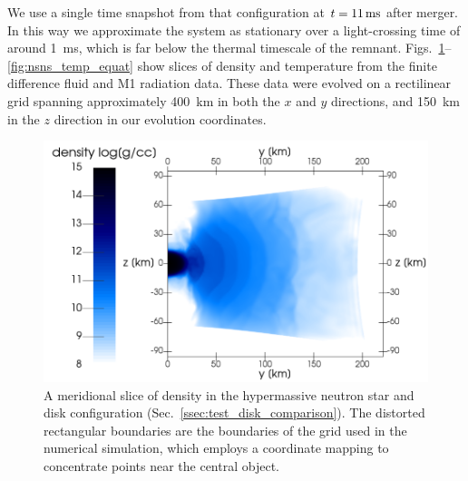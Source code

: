 \documentclass[aps,floatfix,prd,superscriptaddress,twocolumn]{revtex4-1}
\begin{document}
We use a single time snapshot from that configuration
at $t=11\,{\rm ms}$ after merger.
In this way we approximate the system as stationary over a light-crossing time
of around 1~ms, which is far below the thermal timescale of the remnant.
Figs.~\ref{fig:nsns_rho_merid}--\ref{fig:nsns_temp_equat}
show slices of density and temperature from the finite difference
fluid and M1 radiation data.
These data were evolved on a rectilinear grid spanning approximately 400~km in
both the $x$ and $y$ directions, and 150~km in the $z$ direction in our
evolution coordinates.

\begin{figure}
  \includegraphics[width=\columnwidth]{production-colormap-merid-rho}
  \caption{A meridional slice of density in the hypermassive neutron
    star and disk configuration (Sec.~\ref{ssec:test_disk_comparison}).
    The distorted rectangular boundaries are the boundaries of the grid
    used in the numerical simulation, which employs a coordinate mapping to
    concentrate points near the central object.}
  \label{fig:nsns_rho_merid}
\end{figure}
\end{document}
